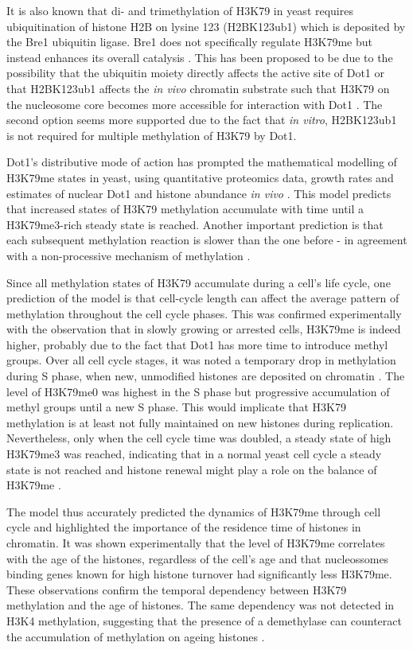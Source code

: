 \documentclass[11pt,twoside,a4paper]{report}
\begin{document}
		It is also known that di- and trimethylation of H3K79 in yeast requires ubiquitination of histone H2B on lysine 123 (H2BK123ub1) which is deposited by the Bre1 ubiquitin ligase. Bre1 does not specifically regulate H3K79me but instead enhances its overall catalysis \cite{Kouzarides2007} \cite{Frederiks2008}. This has been proposed to be due to the possibility that the ubiquitin moiety directly affects the active site of Dot1 or that H2BK123ub1 affects the \textit{in vivo} chromatin substrate such that H3K79 on the nucleosome core becomes more accessible for interaction with Dot1 \cite{Frederiks2008}. The second option seems more supported due to the fact that \textit{in vitro}, H2BK123ub1 is not required for multiple methylation of H3K79 by Dot1.
		
		Dot1's distributive mode of action has prompted the mathematical modelling of H3K79me states in yeast, using quantitative proteomics data, growth rates and estimates of nuclear Dot1 and histone abundance \textit{in vivo} \cite{DeVos2011}. This model predicts that increased states of H3K79 methylation accumulate with time until a H3K79me3-rich steady state is reached. Another important prediction is that each subsequent methylation reaction is slower than the one before - in agreement with a non-processive mechanism of methylation \cite{DeVos2011}.
			
		Since all methylation states of H3K79 accumulate during a cell's life cycle, one prediction of the model is that cell-cycle length can affect the average pattern of methylation throughout the cell cycle phases. This was confirmed experimentally with the observation that in slowly growing or arrested cells, H3K79me is indeed higher, probably due to the fact that Dot1 has more time to introduce methyl groups. Over all cell cycle stages, it was noted a temporary drop in methylation during S phase, when new, unmodified histones are deposited on chromatin \cite{DeVos2011}. The level of H3K79me0 was highest in the S phase but progressive accumulation of methyl groups until a new S phase. This would implicate that H3K79 methylation is at least not fully maintained on new histones during replication. Nevertheless, only when the cell cycle time was doubled, a steady state of high H3K79me3 was reached, indicating that in a normal yeast cell cycle a steady state is not reached and histone renewal might play a role on the balance of H3K79me \cite{DeVos2011}.
		
		The model thus accurately predicted the dynamics of H3K79me through cell cycle and highlighted the importance of the residence time of histones in chromatin.	It was shown experimentally that the level of H3K79me correlates with the age of the histones, regardless of the cell's age and that nucleossomes binding genes known for high histone turnover had significantly less H3K79me. These observations confirm the temporal dependency between H3K79 methylation and the age of histones. The same dependency was not detected in H3K4 methylation, suggesting that the presence of a demethylase can counteract the accumulation of methylation on ageing histones \cite{DeVos2011}.
		
\end{document}
